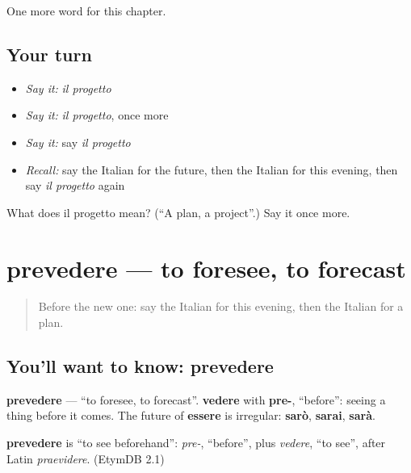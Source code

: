 \begin{grammarlens}[title={What you've built}]
One more word for this chapter.
\end{grammarlens}

\subsection*{Your turn}
\begin{itemize}
\raggedright
  \item \emph{Say it:} \emph{il progetto}
  \item \emph{Say it:} \emph{il progetto}, once more
  \item \emph{Say it:} say \emph{il progetto}
  \item \emph{Recall:} say the Italian for the future, then the Italian for this evening, then say \emph{il progetto} again
\end{itemize}

\begin{tcolorbox}[breakable,colback=teal!4,colframe=teal!35!black,title={Before you move on}]
What does il progetto mean? (\textquotedblleft{}A plan, a project\textquotedblright{}.) Say it once more.
\end{tcolorbox}
\section[prevedere]{prevedere — to foresee, to forecast}

\label{lesson:IT-C138-prevedere}



\begin{quote}
Before the new one: say the Italian for this evening, then the Italian for a plan.
\end{quote}

\subsection*{You'll want to know: prevedere}
\textbf{prevedere} — \textquotedblleft{}to foresee, to forecast\textquotedblright{}. \textbf{vedere} with \textbf{pre-}, \textquotedblleft{}before\textquotedblright{}: seeing a thing before it comes. The future of \textbf{essere} is irregular: \textbf{sarò}, \textbf{sarai}, \textbf{sarà}.

\begin{cousinweb}
\textbf{prevedere} is \textquotedblleft{}to see beforehand\textquotedblright{}: \emph{pre-}, \textquotedblleft{}before\textquotedblright{}, plus \emph{vedere}, \textquotedblleft{}to see\textquotedblright{}, after Latin \emph{praevidere}. (EtymDB 2.1)
\end{cousinweb}

